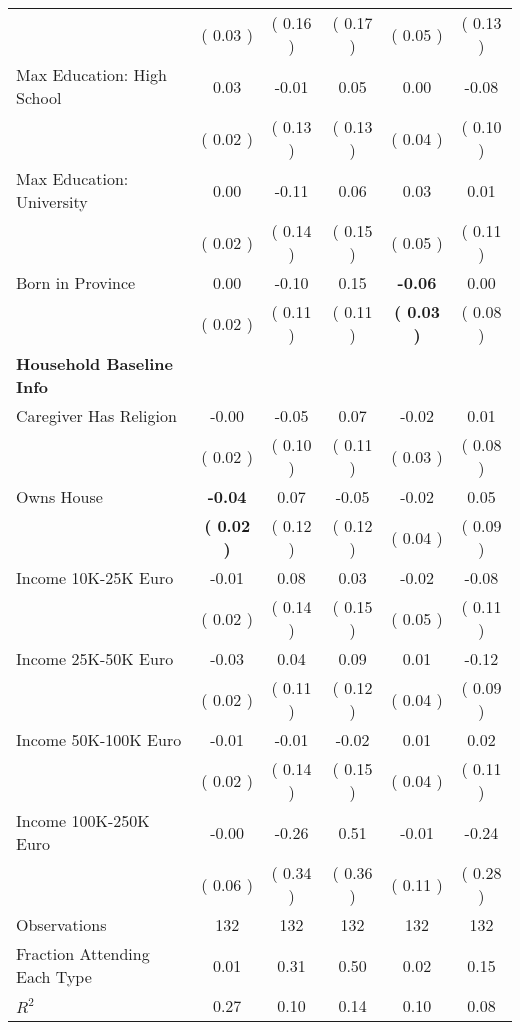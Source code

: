 \begin{table}[H]
{\begin{tabular}{lccccc}
\quad  & (     0.03 ) & (     0.16 )  & (     0.17 )  & (     0.05 ) & (     0.13 ) \\
\quad Max Education: High School &      0.03 &     -0.01 &      0.05 &      0.00 &     -0.08 \\
\quad  & (     0.02 ) & (     0.13 )  & (     0.13 )  & (     0.04 ) & (     0.10 ) \\
\quad Max Education: University &      0.00 &     -0.11 &      0.06 &      0.03 &      0.01 \\
\quad  & (     0.02 ) & (     0.14 )  & (     0.15 )  & (     0.05 ) & (     0.11 ) \\
\quad Born in Province &      0.00 &     -0.10 &      0.15 & \textbf{    -0.06} &      0.00 \\
\quad  & (     0.02 ) & (     0.11 )  & (     0.11 )  & \textbf{(     0.03 )} & (     0.08 ) \\
\midrule
\textbf{Household Baseline Info} \\
\quad Caregiver Has Religion &     -0.00 &     -0.05 &      0.07 &     -0.02 &      0.01 \\
\quad  & (     0.02 ) & (     0.10 )  & (     0.11 )  & (     0.03 ) & (     0.08 ) \\
\quad Owns House & \textbf{    -0.04} &      0.07 &     -0.05 &     -0.02 &      0.05 \\
\quad  & \textbf{(     0.02 )} & (     0.12 )  & (     0.12 )  & (     0.04 ) & (     0.09 ) \\
\quad Income 10K-25K Euro &     -0.01 &      0.08 &      0.03 &     -0.02 &     -0.08 \\
\quad  & (     0.02 ) & (     0.14 )  & (     0.15 )  & (     0.05 ) & (     0.11 ) \\
\quad Income 25K-50K Euro &     -0.03 &      0.04 &      0.09 &      0.01 &     -0.12 \\
\quad  & (     0.02 ) & (     0.11 )  & (     0.12 )  & (     0.04 ) & (     0.09 ) \\
\quad Income 50K-100K Euro &     -0.01 &     -0.01 &     -0.02 &      0.01 &      0.02 \\
\quad  & (     0.02 ) & (     0.14 )  & (     0.15 )  & (     0.04 ) & (     0.11 ) \\
\quad Income 100K-250K Euro &     -0.00 &     -0.26 &      0.51 &     -0.01 &     -0.24 \\
\quad  & (     0.06 ) & (     0.34 )  & (     0.36 )  & (     0.11 ) & (     0.28 ) \\
\midrule
Observations & 132 & 132 & 132 & 132 & 132 \\
Fraction Attending Each Type &      0.01 &      0.31 &      0.50 &      0.02 &      0.15 \\
\midrule
$ R^2$ &      0.27 &      0.10 &      0.14 &      0.10 &      0.08 \\
\bottomrule
\end{tabular}}
\end{table}
